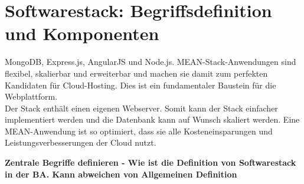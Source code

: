 \section{Softwarestack: Begriffsdefinition und Komponenten}\label{sec:basics-softwarestack-definition}
MongoDB, Express.js, AngularJS und Node.js. MEAN-Stack-Anwendungen sind flexibel, skalierbar und erweiterbar und machen sie damit zum perfekten Kandidaten für Cloud-Hosting. Dies ist ein fundamentaler Baustein für die Webplattform.\\ 
Der Stack enthält einen eigenen Webserver. Somit kann der Stack einfacher implementiert werden und die Datenbank kann auf Wunsch skaliert werden. Eine MEAN-Anwendung ist so optimiert, dass sie alle Kosteneinsparungen und Leistungsverbesserungen der Cloud nutzt.


\textbf{Zentrale Begriffe definieren - Wie ist die Definition von Softwarestack in der BA. Kann abweichen von Allgemeinen Definition}
